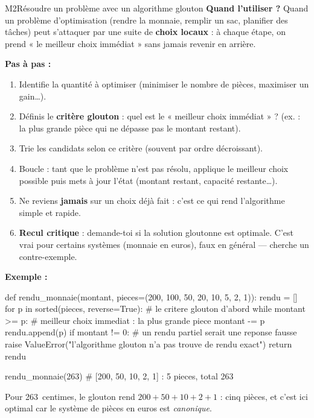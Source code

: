 \begin{fichemethode}{M2}{Résoudre un problème avec un algorithme glouton}
\textbf{Quand l'utiliser ?} Quand un problème d'optimisation (rendre la monnaie, remplir un sac, planifier des tâches) peut s'attaquer par une suite de \textbf{choix locaux} : à chaque étape, on prend « le meilleur choix immédiat » sans jamais revenir en arrière.

\textbf{Pas à pas :}
\begin{enumerate}
  \item Identifie la quantité à optimiser (minimiser le nombre de pièces, maximiser un gain\ldots).
  \item Définis le \textbf{critère glouton} : quel est le « meilleur choix immédiat » ? (ex. : la plus grande pièce qui ne dépasse pas le montant restant).
  \item Trie les candidats selon ce critère (souvent par ordre décroissant).
  \item Boucle : tant que le problème n'est pas résolu, applique le meilleur choix possible puis mets à jour l'état (montant restant, capacité restante\ldots).
  \item Ne reviens \textbf{jamais} sur un choix déjà fait : c'est ce qui rend l'algorithme simple et rapide.
  \item \textbf{Recul critique} : demande-toi si la solution gloutonne est optimale.
    C'est vrai pour certains systèmes (monnaie en euros), faux en général — cherche un contre-exemple.
\end{enumerate}

\textbf{Exemple :}
\begin{python}
def rendu_monnaie(montant, pieces=(200, 100, 50, 20, 10, 5, 2, 1)):
    rendu = []
    for p in sorted(pieces, reverse=True):   # le critere glouton d'abord
        while montant >= p:     # meilleur choix immediat : la plus grande piece
            montant -= p
            rendu.append(p)
    if montant != 0:            # un rendu partiel serait une reponse fausse
        raise ValueError("l'algorithme glouton n'a pas trouve de rendu exact")
    return rendu

rendu_monnaie(263)   # [200, 50, 10, 2, 1] : 5 pieces, total 263
\end{python}
Pour 263~centimes, le glouton rend $200 + 50 + 10 + 2 + 1$ : cinq pièces, et
c'est ici optimal car le système de pièces en euros est \emph{canonique}.


\end{fichemethode}

